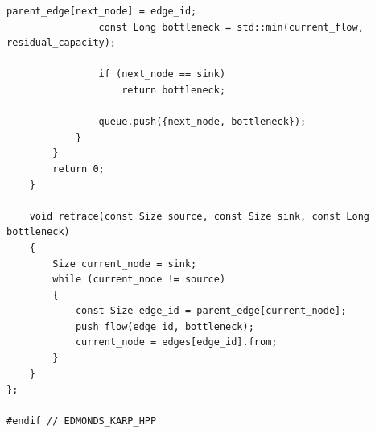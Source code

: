 \documentclass[12pt,a4paper]{article}
\begin{document}
\begin{lstlisting}[caption={Implementação em C++ da classe \lstinline{EdmondsKarp}, baseada na seleção iterativa de caminhos mais curtos via Busca em Largura (BFS).}, label={lst:edmonds_karp}]
				parent_edge[next_node] = edge_id;
				const Long bottleneck = std::min(current_flow, residual_capacity);

				if (next_node == sink)
					return bottleneck;

				queue.push({next_node, bottleneck});
			}
		}
		return 0;
	}

	void retrace(const Size source, const Size sink, const Long bottleneck)
	{
		Size current_node = sink;
		while (current_node != source)
		{
			const Size edge_id = parent_edge[current_node];
			push_flow(edge_id, bottleneck);
			current_node = edges[edge_id].from;
		}
	}
};

#endif // EDMONDS_KARP_HPP
\end{lstlisting}

\newpage

\label{ap:dinic}
\end{document}
